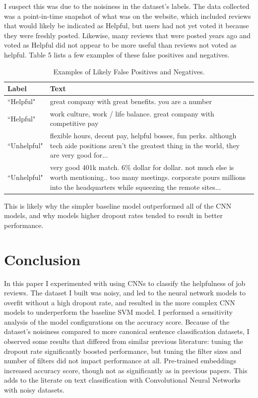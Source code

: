 \documentclass[11pt,a4paper]{article}
\begin{document}
	I suspect this was due to the noisiness in the dataset's labels. The data collected was a point-in-time snapshot of what was on the website, which included reviews that would likely be indicated as Helpful, but users had not yet voted it because they were freshly posted. Likewise, many reviews that were posted years ago and voted as Helpful did not appear to be more useful than reviews not voted as helpful. Table 5 lists a few examples of these false positives and negatives.
	
	\begin{table}[h]
	\begin{center}
	\begin{tabular}{|p{1.7cm}|p{5cm}|}
	\hline \textbf{Label} & \textbf{Text} \\ \hline
	``Helpful" & great company with great benefits. you are a number \\
	\hline
	``Helpful" & work culture, work / life balance. great company with competitive pay \\
	\hline
	``Unhelpful" & flexible hours, decent pay, helpful bosses, fun perks. although tech aide positions aren't the greatest thing in the world, they are very good for...\\
	\hline
	``Unhelpful" & very good 401k match. 6\% dollar for dollar. not much else is worth mentioning.. too many meetings. corporate pours millions into the headquarters while squeezing the remote sites...\\
	\hline
	\end{tabular}
	\caption[scale=0.75]{Examples of Likely False Positives and Negatives.}
	\end{center}
	\end{table}
	
	This is likely why the simpler baseline model outperformed all of the CNN models, and why models higher dropout rates tended to result in better performance.

	\section{Conclusion}
	In this paper I experimented with using CNNs to classify the helpfulness of job reviews. The dataset I built was noisy, and led to the neural network models to overfit without a high dropout rate, and resulted in the more complex CNN models to underperform the baseline SVM model. I performed a sensitivity analysis of the model configurations on the accuracy score. Because of the dataset's noisiness compared to more canonical sentence classification datasets, I observed some results that differed from similar previous literature: tuning the dropout rate significantly boosted performance, but tuning the filter sizes and number of filters did not impact performance at all. Pre-trained embeddings increased accuracy score, though not as significantly as in previous papers. This adds to the literate on text classification with Convolutional Neural Networks with noisy datasets.
	
	
	
	
	
	
	
\end{document}
